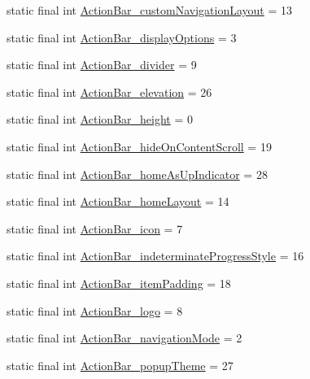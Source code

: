 \begin{CompactItemize}
\item 
static final int \hyperlink{classandroid_1_1support_1_1v4_1_1_r_1_1styleable_f3b2158180d9362405027a8913901587}{ActionBar\_\-customNavigationLayout} = 13
\item 
static final int \hyperlink{classandroid_1_1support_1_1v4_1_1_r_1_1styleable_60b6f63f434384dc991ae78a8335cef3}{ActionBar\_\-displayOptions} = 3
\item 
static final int \hyperlink{classandroid_1_1support_1_1v4_1_1_r_1_1styleable_d827f43a76e4f9b7a6f0459ff2a4b5b8}{ActionBar\_\-divider} = 9
\item 
static final int \hyperlink{classandroid_1_1support_1_1v4_1_1_r_1_1styleable_0516184b1cd0e4ef27327318c1bdc7c4}{ActionBar\_\-elevation} = 26
\item 
static final int \hyperlink{classandroid_1_1support_1_1v4_1_1_r_1_1styleable_e9d68fc513f852dd01e0da8392efa4d1}{ActionBar\_\-height} = 0
\item 
static final int \hyperlink{classandroid_1_1support_1_1v4_1_1_r_1_1styleable_d0bacf654ec88cf7bbf7f62214466f22}{ActionBar\_\-hideOnContentScroll} = 19
\item 
static final int \hyperlink{classandroid_1_1support_1_1v4_1_1_r_1_1styleable_e0ce4cd42f818c233a5c824e297a6329}{ActionBar\_\-homeAsUpIndicator} = 28
\item 
static final int \hyperlink{classandroid_1_1support_1_1v4_1_1_r_1_1styleable_5bac411a91b290a049eda35aa2ffac76}{ActionBar\_\-homeLayout} = 14
\item 
static final int \hyperlink{classandroid_1_1support_1_1v4_1_1_r_1_1styleable_7ea505dc252b6d9f9dd2c9e6251d35fe}{ActionBar\_\-icon} = 7
\item 
static final int \hyperlink{classandroid_1_1support_1_1v4_1_1_r_1_1styleable_a8a88b78aad97f680e3cbee4dd08ef23}{ActionBar\_\-indeterminateProgressStyle} = 16
\item 
static final int \hyperlink{classandroid_1_1support_1_1v4_1_1_r_1_1styleable_10e74e1d287a83eeaec631e4753a9d2f}{ActionBar\_\-itemPadding} = 18
\item 
static final int \hyperlink{classandroid_1_1support_1_1v4_1_1_r_1_1styleable_239d55172c67152fbf4c566f3de2f586}{ActionBar\_\-logo} = 8
\item 
static final int \hyperlink{classandroid_1_1support_1_1v4_1_1_r_1_1styleable_57771890bb08e78ec220a5ffac58bd77}{ActionBar\_\-navigationMode} = 2
\item 
static final int \hyperlink{classandroid_1_1support_1_1v4_1_1_r_1_1styleable_fbc82042283d6f161c64d06b055e15dc}{ActionBar\_\-popupTheme} = 27

\end{CompactItemize}
